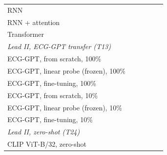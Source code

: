 \begin{tabular}{lccccc}
\quad RNN & \comparisonTestAurocNORMMeanOneleadRnn{} & \comparisonTestAurocMIMeanOneleadRnn{} & \comparisonTestAurocSTTCMeanOneleadRnn{} & \comparisonTestAurocCDMeanOneleadRnn{} & \comparisonTestAurocHYPMeanOneleadRnn{} \\
\quad RNN + attention & \comparisonTestAurocNORMMeanOneleadRnnattn{} & \comparisonTestAurocMIMeanOneleadRnnattn{} & \comparisonTestAurocSTTCMeanOneleadRnnattn{} & \comparisonTestAurocCDMeanOneleadRnnattn{} & \comparisonTestAurocHYPMeanOneleadRnnattn{} \\
\quad Transformer & \comparisonTestAurocNORMMeanOneleadTransformer{} & \comparisonTestAurocMIMeanOneleadTransformer{} & \comparisonTestAurocSTTCMeanOneleadTransformer{} & \comparisonTestAurocCDMeanOneleadTransformer{} & \comparisonTestAurocHYPMeanOneleadTransformer{} \\
\multicolumn{6}{l}{\textit{Lead II, ECG-GPT transfer (T13)}} \\
\quad ECG-GPT, from scratch, 100\% & \comparisonTestAurocNORMMeanScratchFOneZeroZero{} & \comparisonTestAurocMIMeanScratchFOneZeroZero{} & \comparisonTestAurocSTTCMeanScratchFOneZeroZero{} & \comparisonTestAurocCDMeanScratchFOneZeroZero{} & \comparisonTestAurocHYPMeanScratchFOneZeroZero{} \\
\quad ECG-GPT, linear probe (frozen), 100\% & \comparisonTestAurocNORMMeanProbeFOneZeroZero{} & \comparisonTestAurocMIMeanProbeFOneZeroZero{} & \comparisonTestAurocSTTCMeanProbeFOneZeroZero{} & \comparisonTestAurocCDMeanProbeFOneZeroZero{} & \comparisonTestAurocHYPMeanProbeFOneZeroZero{} \\
\quad ECG-GPT, fine-tuning, 100\% & \comparisonTestAurocNORMMeanFinetuneFOneZeroZero{} & \comparisonTestAurocMIMeanFinetuneFOneZeroZero{} & \comparisonTestAurocSTTCMeanFinetuneFOneZeroZero{} & \comparisonTestAurocCDMeanFinetuneFOneZeroZero{} & \comparisonTestAurocHYPMeanFinetuneFOneZeroZero{} \\
\quad ECG-GPT, from scratch, 10\% & \comparisonTestAurocNORMMeanScratchFOneZero{} & \comparisonTestAurocMIMeanScratchFOneZero{} & \comparisonTestAurocSTTCMeanScratchFOneZero{} & \comparisonTestAurocCDMeanScratchFOneZero{} & \comparisonTestAurocHYPMeanScratchFOneZero{} \\
\quad ECG-GPT, linear probe (frozen), 10\% & \comparisonTestAurocNORMMeanProbeFOneZero{} & \comparisonTestAurocMIMeanProbeFOneZero{} & \comparisonTestAurocSTTCMeanProbeFOneZero{} & \comparisonTestAurocCDMeanProbeFOneZero{} & \comparisonTestAurocHYPMeanProbeFOneZero{} \\
\quad ECG-GPT, fine-tuning, 10\% & \comparisonTestAurocNORMMeanFinetuneFOneZero{} & \comparisonTestAurocMIMeanFinetuneFOneZero{} & \comparisonTestAurocSTTCMeanFinetuneFOneZero{} & \comparisonTestAurocCDMeanFinetuneFOneZero{} & \comparisonTestAurocHYPMeanFinetuneFOneZero{} \\
\multicolumn{6}{l}{\textit{Lead II, zero-shot (T24)}} \\
\quad CLIP ViT-B/32, zero-shot & \comparisonTestAurocNORMMeanZeroshot{} & \comparisonTestAurocMIMeanZeroshot{} & \comparisonTestAurocSTTCMeanZeroshot{} & \comparisonTestAurocCDMeanZeroshot{} & \comparisonTestAurocHYPMeanZeroshot{} \\
\bottomrule
\end{tabular}
